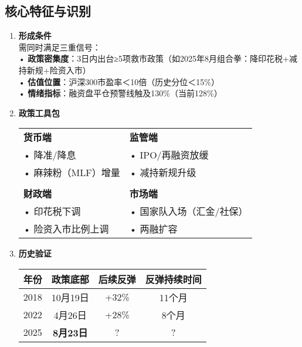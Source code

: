 \subsection{核心特征与识别}
\begin{enumerate}[leftmargin=*, nosep]
    \item \textbf{形成条件}  \\
    需同时满足三重信号：\\
    • \textbf{政策密集度}：3日内出台≥5项救市政策（如2025年8月组合拳：降印花税+减持新规+险资入市）\\
    • \textbf{估值位置}：沪深300市盈率＜10倍（历史分位＜15\%）\\
    • \textbf{情绪指标}：融资盘平仓预警线触及130\%（当前128\%）

    \item \textbf{政策工具包}  \\
    \begin{tabular}{p{5cm}p{5cm}}
        \textbf{货币端} & \textbf{监管端} \\
        • 降准/降息 & • IPO/再融资放缓 \\
        • 麻辣粉（MLF）增量 & • 减持新规升级 \\
        & \\
        \textbf{财政端} & \textbf{市场端} \\
        • 印花税下调 & • 国家队入场（汇金/社保） \\
        • 险资入市比例上调 & • 两融扩容 \\
    \end{tabular}
    
    \item \textbf{历史验证}  \\
    
\begin{tabular}{c|c|c|c}
        年份 & 政策底部 & 后续反弹 & 反弹持续时间 \\
        \hline
        2018 & 10月19日 & +32\% & 11个月 \\
        2022 & 4月26日 & +28\% & 8个月 \\
        2025 & \textbf{8月23日} & ? & ? \\
    \end{tabular}
\end{enumerate}

